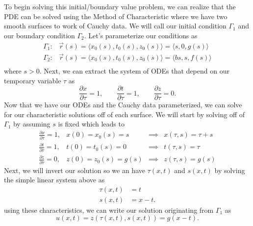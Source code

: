 \documentclass[a4paper,12pt]{article}
\begin{document}
\begin{enumerate}[label = \textbf{(\alph*)}]
        To begin solving this initial/boundary value problem, we can realize that the PDE can be solved using the Method of Characteristic where we have two smooth surfaces to work of Cauchy data. We will call our initial condition $ \Gamma_1 $ and our boundary condition $ \Gamma_2 $. Let's parameterize our conditions as
        \[
            \begin{array}{rl}
                \Gamma_1: & \vec{r}(s) = \langle x_0(s), t_0(s), z_0(s) \rangle = \langle s, 0, g(s)  \rangle \\
                \Gamma_2: & \vec{r}(s) = \langle x_0(s), t_0(s), z_0(s) \rangle = \langle bs, s, f(s)  \rangle \\
            \end{array}
        \]
        where $ s > 0 $. Next, we can extract the system of ODEs that depend on our temporary variable $ \tau $ as
        \[
            \frac{\partial x}{\partial \tau} = 1, \qquad \frac{\partial t}{\partial \tau} = 1, \qquad \frac{\partial z}{\partial \tau} = 0.
        \]
        Now that we have our ODEs and the Cauchy data parameterized, we can solve for our characteristic solutions off of each surface. We will start by solving off of $ \Gamma_1 $ by assuming $ s $ is fixed which leads to
        \[
            \begin{array}{rccl}
                \frac{\partial x}{\partial \tau} = 1, & x(0) = x_0(s) = s & \implies & x(\tau, s) = \tau + s \\
                \frac{\partial t}{\partial \tau} = 1, & t(0) = t_0(s) = 0 & \implies & t(\tau, s) = \tau \\
                \frac{\partial z}{\partial \tau} = 0, & z(0) = z_0(s) = g(s) & \implies & z(\tau, s) = g(s)
            \end{array}
        \]
        Next, we will invert our solution so we an have $ \tau(x,t) $ and $ s(x,t) $  by solving the simple linear system above as
        \begin{align*}
            \tau(x,t) &= t \\
            s(x,t) &= x - t.
        \end{align*}
        using these characteristics, we can write our solution originating from $ \Gamma_1 $ as
        \begin{equation}
            u(x,t) = z(\tau(x,t), s(x,t)) = g(x - t). \label{soln:gamma1}
        \end{equation}
    

\end{enumerate}
\end{document}
